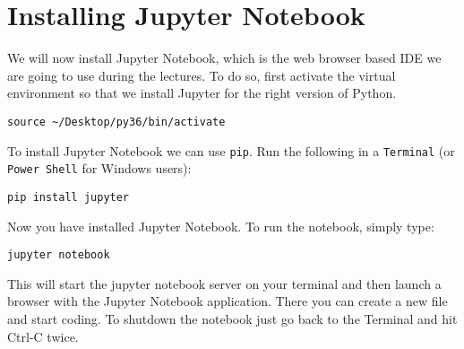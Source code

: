 \documentclass[12pt, a4paper]{article}
\begin{document}
\section*{Installing Jupyter Notebook}
\label{sec:org47b97b1}
We will now install Jupyter Notebook, which is the web browser based IDE we are going to use during the lectures.
To do so, first activate the virtual environment so that we install Jupyter for the right version of Python.
\lstset{language=bash,label= ,caption= ,captionpos=b,firstnumber=1,numbers=left,style=bash}
\begin{lstlisting}
source ~/Desktop/py36/bin/activate
\end{lstlisting}
To install Jupyter Notebook we can use \texttt{pip}. Run the following in a \texttt{Terminal} (or \texttt{Power Shell} for Windows users):
\lstset{language=bash,label= ,caption= ,captionpos=b,firstnumber=1,numbers=left,style=bash}
\begin{lstlisting}
pip install jupyter
\end{lstlisting}
Now you have installed Jupyter Notebook.
To run the notebook, simply type:
\lstset{language=bash,label= ,caption= ,captionpos=b,firstnumber=1,numbers=left,style=bash}
\begin{lstlisting}
jupyter notebook
\end{lstlisting}
This will start the jupyter notebook server on your terminal and then launch a browser with the Jupyter Notebook application.
There you can create a new file and start coding.
To shutdown the notebook just go back to the Terminal and hit Ctrl-C twice.
\end{document}
